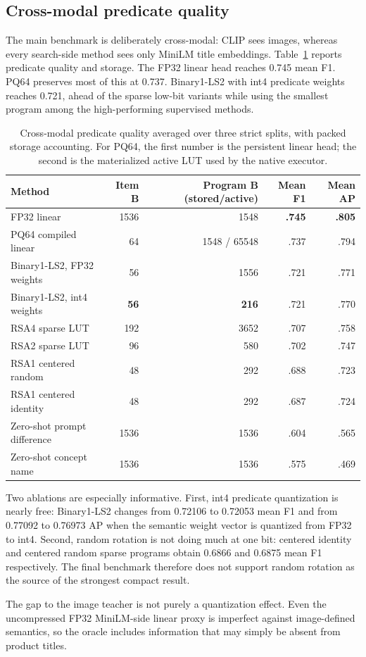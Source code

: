 \subsection{Cross-modal predicate quality}
The main benchmark is deliberately cross-modal: CLIP sees images, whereas every search-side method sees only MiniLM title embeddings. Table~\ref{tab:predicate_finalists} reports predicate quality and storage. The FP32 linear head reaches 0.745 mean F1. PQ64 preserves most of this at 0.737. Binary1-LS2 with int4 predicate weights reaches 0.721, ahead of the sparse low-bit variants while using the smallest program among the high-performing supervised methods.

\begin{table}[t]
\centering
\caption{Cross-modal predicate quality averaged over three strict splits, with packed storage accounting. For PQ64, the first number is the persistent linear head; the second is the materialized active LUT used by the native executor.}
\label{tab:predicate_finalists}
\small
\begin{tabular}{lrrrr}
\toprule
Method & Item B & Program B (stored/active) & Mean F1 & Mean AP\\
\midrule
FP32 linear & 1536 & 1548 & \textbf{.745} & \textbf{.805}\\
PQ64 compiled linear & 64 & 1548 / 65548 & .737 & .794\\
Binary1-LS2, FP32 weights & 56 & 1556 & .721 & .771\\
Binary1-LS2, int4 weights & \textbf{56} & \textbf{216} & .721 & .770\\
RSA4 sparse LUT & 192 & 3652 & .707 & .758\\
RSA2 sparse LUT & 96 & 580 & .702 & .747\\
RSA1 centered random & 48 & 292 & .688 & .723\\
RSA1 centered identity & 48 & 292 & .687 & .724\\
Zero-shot prompt difference & 1536 & 1536 & .604 & .565\\
Zero-shot concept name & 1536 & 1536 & .575 & .469\\
\bottomrule
\end{tabular}
\end{table}

Two ablations are especially informative. First, int4 predicate quantization is nearly free: Binary1-LS2 changes from 0.72106 to 0.72053 mean F1 and from 0.77092 to 0.76973 AP when the semantic weight vector is quantized from FP32 to int4. Second, random rotation is not doing much at one bit: centered identity and centered random sparse programs obtain 0.6866 and 0.6875 mean F1 respectively. The final benchmark therefore does not support random rotation as the source of the strongest compact result.

The gap to the image teacher is not purely a quantization effect. Even the uncompressed FP32 MiniLM-side linear proxy is imperfect against image-defined semantics, so the oracle includes information that may simply be absent from product titles.
